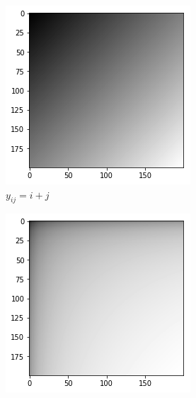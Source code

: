 \documentclass{article}
\begin{document}
\begin{figure}[htb]
  \centering
  \begin{subfigure}[b]{0.24\linewidth}
    \includegraphics[width=\linewidth]{images/parametric_model_1.png}
    \caption{$y_{ij} = i+j$}
  \end{subfigure}
  \begin{subfigure}[b]{0.24\linewidth}
    \includegraphics[width=\linewidth]{images/parametric_model_2.png}

\end{subfigure}
\end{figure}
\end{document}
